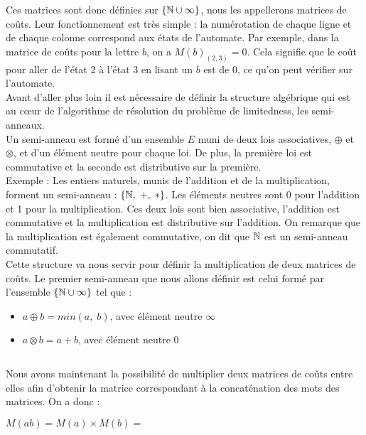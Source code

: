 \documentclass{report}
\begin{document}
Ces matrices sont donc définies sur $\{\mathbb{N} \cup \infty\}$, nous les appellerons matrices de coûts. Leur fonctionnement est très simple : la numérotation de chaque ligne et de chaque colonne correspond aux états de l'automate. Par exemple, dans la matrice de coûts pour la lettre $b$, on a $M(b)_{(2,3)}=0$. Cela signifie que le coût pour aller de l'état 2 à l'état 3 en lisant un $b$ est de 0, ce qu'on peut vérifier sur l'automate. \\

Avant d'aller plus loin il est nécessaire de définir la structure algébrique qui est au cœur de l'algorithme de résolution du problème de limitedness, les semi-anneaux.\\
Un semi-anneau est formé d'un ensemble $E$ muni de deux lois associatives, $\oplus$ et $\otimes$, et d'un élément neutre pour chaque loi. De plus, la première loi est commutative et la seconde est distributive sur la première.\\
Exemple : Les entiers naturels, munis de l'addition et de la multiplication, forment un semi-anneau : $\{ \mathbb{N},\;+,\;* \}$. Les éléments neutres sont 0 pour l'addition et 1 pour la multiplication. Ces deux lois sont bien associative, l'addition est commutative et la multiplication est distributive sur l'addition. On remarque que la multiplication est également commutative, on dit que $\mathbb{N}$ est un semi-anneau commutatif.\\

Cette structure va nous servir pour définir la multiplication de deux matrices de coûts. Le premier semi-anneau que nous allons définir est celui formé par l'ensemble $\{\mathbb{N} \cup \infty\}$ tel que :
\begin{itemize}
\item $a \oplus b = min(a,\;b)$, avec élément neutre $\infty$
\item $a \otimes b = a + b$, avec élément neutre $0$
\end{itemize}
$\ $

Nous avons maintenant la possibilité de multiplier deux matrices de coûts entre elles afin d'obtenir la matrice correspondant à la concaténation des mots des matrices. On a donc :
\begin{center}
$M(ab) = M(a) \times M(b) =$
\end{center}
$\ $
\end{document}
